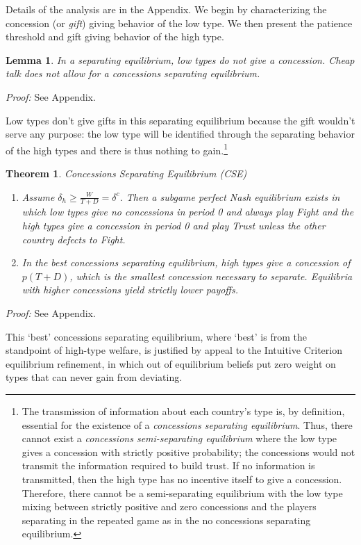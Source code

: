 \documentclass[12pt, letterpaper]{article}
\newcommand{\de}{\delta}
\newtheorem{theorem}{Theorem}
\newtheorem{lemma}{Lemma}
\begin{document}
Details of the analysis are in the Appendix. We begin by characterizing the concession (or \emph{gift}) giving behavior of the low type. We then present the patience threshold and gift giving behavior of the high type.

\begin{lemma}
	In a separating equilibrium, low types do not give a concession. Cheap talk does not allow for a concessions separating equilibrium.
	\label{lemma:3}
\end{lemma}
\emph{Proof:} See Appendix.

Low types don't give gifts in this separating equilibrium because the gift wouldn't serve any purpose: the low type will be identified through the separating behavior of the high types and there is thus nothing to gain.\footnote{The transmission of information about each country's type is, by definition, essential for the existence of a \emph{concessions separating equilibrium}. Thus, there cannot exist a \emph{concessions semi-separating equilibrium} where the low type gives a concession with strictly positive probability; the concessions would not transmit the information required to build trust. If no information is transmitted, then the high type has no incentive itself to give a concession. Therefore, there cannot be a semi-separating equilibrium with the low type mixing between strictly positive and zero concessions and the players separating in the repeated game as in the no concessions separating equilibrium.}

\begin{theorem}
\emph{Concessions Separating Equilibrium (CSE)}
	\begin{enumerate}
		\item[(a)] Assume $\delta_h \geq \frac{W}{T+D} = \de^{c}$. Then a subgame perfect Nash equilibrium exists in which low types give no concessions in period 0 and always play Fight and the high types give a concession in period 0 and play Trust unless the other country defects to Fight.
		\item[(b)] In the best concessions separating equilibrium, high types give a concession of $p(T + D)$, which is the smallest concession necessary to separate. Equilibria with higher concessions yield strictly lower payoffs.
\end{enumerate}
	\label{theorem:2}
\end{theorem}
\emph{Proof:} See Appendix.

This `best' concessions separating equilibrium, where `best' is from the standpoint of high-type welfare, is justified by appeal to the Intuitive Criterion equilibrium refinement, in which out of equilibrium beliefs put zero weight on types that can never gain from deviating.
\end{document}
